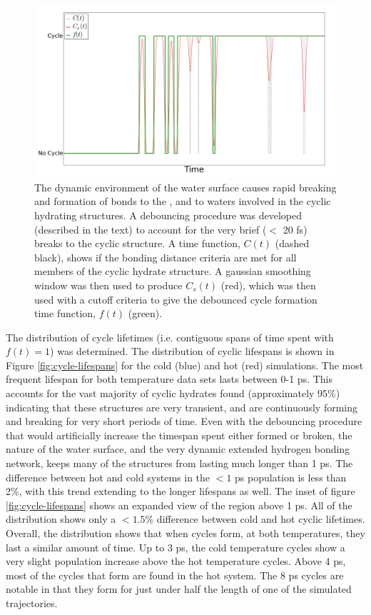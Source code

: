 \begin{figure}[h!]
	\begin{center}
		\includegraphics[scale=1.0]{images/cycles/cycle-debouncing-small.png}
		\caption{The dynamic environment of the water surface causes rapid breaking and formation of bonds to the \suldiox, and to waters involved in the cyclic hydrating structures. A debouncing procedure was developed (described in the text) to account for the very brief ($<$ 20 fs) breaks to the cyclic structure. A time function, $C(t)$ (dashed black), shows if the bonding distance criteria are met for all members of the cyclic hydrate structure. A gaussian smoothing window was then used to produce $C_s(t)$ (red), which was then used with a cutoff criteria to give the debounced cycle formation time function, $f(t)$ (green).}
		\label{fig:debouncing}
	\end{center}
\end{figure}

The distribution of cycle lifetimes (i.e. contiguous spans of time spent with $f(t) = 1$) was determined. The distribution of cyclic lifespans is shown in Figure \ref{fig:cycle-lifespans} for the cold (blue) and hot (red) simulations. The most frequent lifespan for both temperature data sets lasts between 0-1 ps. This accounts for the vast majority of cyclic hydrates found (approximately 95\%) indicating that these structures are very transient, and are continuously forming and breaking for very short periods of time. Even with the debouncing procedure that would artificially increase the timespan spent either formed or broken, the nature of the water surface, and the very dynamic extended hydrogen bonding network, keeps many of the structures from lasting much longer than 1 ps. The difference between hot and cold systems in the $<1$ ps population is less than 2\%, with this trend extending to the longer lifespans as well. The inset of figure \ref{fig:cycle-lifespans} shows an expanded view of the region above 1 ps. All of the distribution shows only a $<1.5$\% difference between cold and hot cyclic lifetimes. Overall, the distribution shows that when cycles form, at both temperatures, they last a similar amount of time. Up to 3 ps, the cold temperature cycles show a very slight population increase above the hot temperature cycles. Above 4 ps, most of the cycles that form are found in the hot system. The 8 ps cycles are notable in that they form for just under half the length of one of the simulated trajectories.


